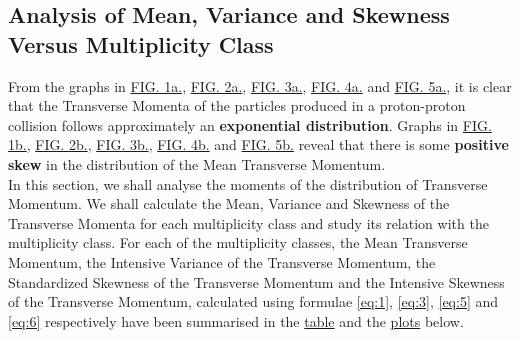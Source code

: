 \documentclass[letterpaper,aps,prc,superscriptaddress,nofootinbib,10pt,showpacs,floatfix]{revtex4-2}%
\begin{document}
\subsection{Analysis of Mean, Variance and Skewness Versus Multiplicity Class}
From the graphs in \hyperref[Fig:1a]{FIG. 1a.}, \hyperref[Fig:2a]{FIG. 2a.}, \hyperref[Fig:3a]{FIG. 3a.}, \hyperref[Fig:4a]{FIG. 4a.} and \hyperref[Fig:5a]{FIG. 5a.}, it is clear that the Transverse Momenta of the particles produced in a proton-proton collision follows approximately an \textbf{exponential distribution}. Graphs in \hyperref[Fig:1b]{FIG. 1b.}, \hyperref[Fig:2b]{FIG. 2b.}, \hyperref[Fig:3b]{FIG. 3b.}, \hyperref[Fig:4b]{FIG. 4b.} and \hyperref[Fig:5b]{FIG. 5b.} reveal that there is some \textbf{positive skew} in the distribution of the Mean Transverse Momentum.
\\
In this section, we shall analyse the moments of the distribution of Transverse Momentum. We shall calculate the Mean, Variance and Skewness of the Transverse Momenta for each multiplicity class and study its relation with the multiplicity class. For each of the multiplicity classes, the Mean Transverse Momentum, the Intensive Variance of the Transverse Momentum, the Standardized Skewness of the Transverse Momentum and the Intensive Skewness of the Transverse Momentum, calculated using formulae \ref{eq:1}, \ref{eq:3}, \ref{eq:5} and \ref{eq:6} respectively have been summarised in the \hyperref[subsubsec:summary]{table} and the \hyperref[subsubsec:mean]{plots} below.

\end{document}
